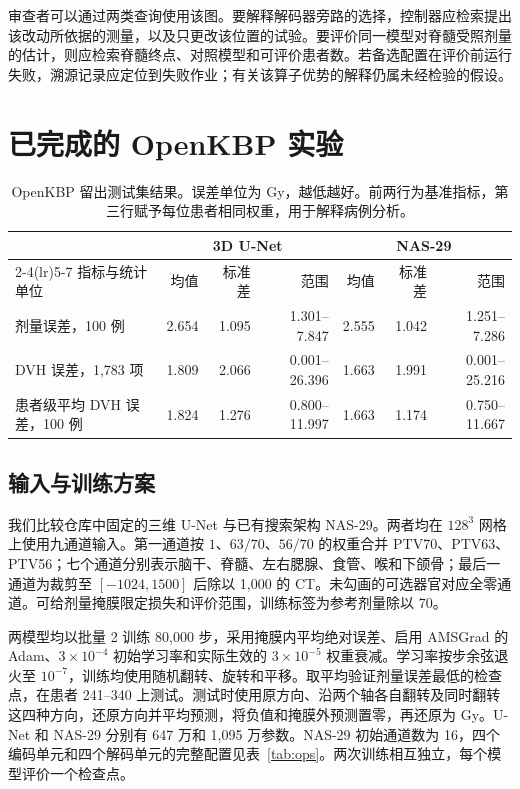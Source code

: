 \documentclass[UTF8,letterpaper,twocolumn,11pt,fontset=fandol]{ctexart}
\begin{document}
审查者可以通过两类查询使用该图。要解释解码器旁路的选择，控制器应检索提出该改动所依据的测量，以及只更改该位置的试验。要评价同一模型对脊髓受照剂量的估计，则应检索脊髓终点、对照模型和可评价患者数。若备选配置在评价前运行失败，溯源记录应定位到失败作业；有关该算子优势的解释仍属未经检验的假设。

\section{已完成的 OpenKBP 实验}
\begin{table}[t]
\centering\small
\begin{tabular}{lrrrrrr}
\toprule
& \multicolumn{3}{c}{3D U-Net} & \multicolumn{3}{c}{NAS-29}\\
\cmidrule(lr){2-4}\cmidrule(lr){5-7}
指标与统计单位 & 均值 & 标准差 & 范围 & 均值 & 标准差 & 范围\\
\midrule
剂量误差，100 例 & 2.654 & 1.095 & 1.301--7.847 & 2.555 & 1.042 & 1.251--7.286\\
DVH 误差，1,783 项 & 1.809 & 2.066 & 0.001--26.396 & 1.663 & 1.991 & 0.001--25.216\\
患者级平均 DVH 误差，100 例 & 1.824 & 1.276 & 0.800--11.997 & 1.663 & 1.174 & 0.750--11.667\\
\bottomrule
\end{tabular}
\caption{OpenKBP 留出测试集结果。误差单位为 Gy，越低越好。前两行为基准指标，第三行赋予每位患者相同权重，用于解释病例分析。}
\label{tab:results}
\end{table}

\subsection{输入与训练方案}
我们比较仓库中固定的三维 U-Net 与已有搜索架构 NAS-29。两者均在 $128^3$ 网格上使用九通道输入。第一通道按 $1$、$63/70$、$56/70$ 的权重合并 PTV70、PTV63、PTV56；七个通道分别表示脑干、脊髓、左右腮腺、食管、喉和下颌骨；最后一通道为裁剪至 $[-1024,1500]$ 后除以 1,000 的 CT。未勾画的可选器官对应全零通道。可给剂量掩膜限定损失和评价范围，训练标签为参考剂量除以 70。

两模型均以批量 2 训练 80,000 步，采用掩膜内平均绝对误差、启用 AMSGrad 的 Adam、$3\times10^{-4}$ 初始学习率和实际生效的 $3\times10^{-5}$ 权重衰减。学习率按步余弦退火至 $10^{-7}$，训练均使用随机翻转、旋转和平移。取平均验证剂量误差最低的检查点，在患者 241--340 上测试。测试时使用原方向、沿两个轴各自翻转及同时翻转这四种方向，还原方向并平均预测，将负值和掩膜外预测置零，再还原为 Gy。U-Net 和 NAS-29 分别有 647 万和 1,095 万参数。NAS-29 初始通道数为 16，四个编码单元和四个解码单元的完整配置见表~\ref{tab:ops}。两次训练相互独立，每个模型评价一个检查点。
\end{document}
